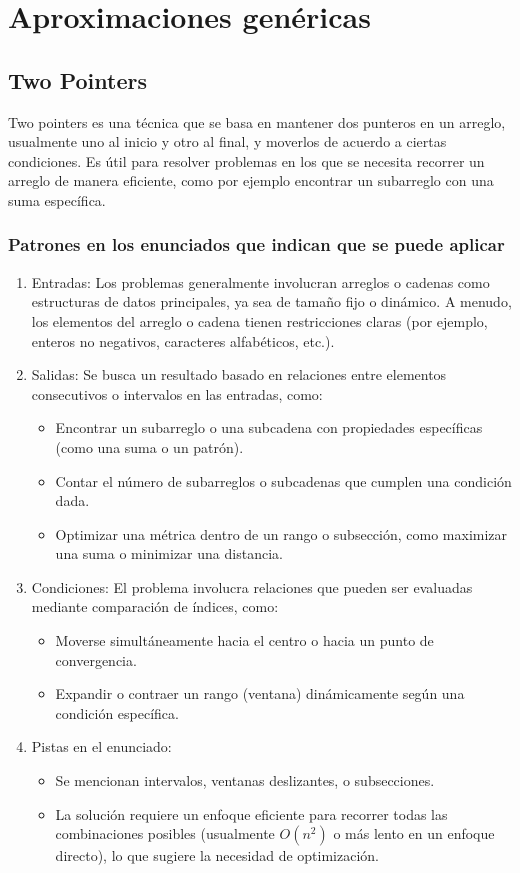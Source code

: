 \section{Aproximaciones genéricas}

\subsection{Two Pointers}
Two pointers es una técnica que se basa en mantener dos punteros en un arreglo, usualmente uno al inicio y otro al final, y moverlos de acuerdo a ciertas condiciones. Es útil para resolver problemas en los que se necesita recorrer un arreglo de manera eficiente, como por ejemplo encontrar un subarreglo con una suma específica. 

\subsubsection{Patrones en los enunciados que indican que se puede aplicar}
\begin{enumerate}
  \item Entradas: Los problemas generalmente involucran arreglos o cadenas como estructuras de datos principales, ya sea de tamaño fijo o dinámico. A menudo, los elementos del arreglo o cadena tienen restricciones claras (por ejemplo, enteros no negativos, caracteres alfabéticos, etc.). 
  \item Salidas: Se busca un resultado basado en relaciones entre elementos consecutivos o intervalos en las entradas, como: 
  \begin{itemize} 
    \item Encontrar un subarreglo o una subcadena con propiedades específicas (como una suma o un patrón). \item Contar el número de subarreglos o subcadenas que cumplen una condición dada. 
    \item Optimizar una métrica dentro de un rango o subsección, como maximizar una suma o minimizar una distancia. 
  \end{itemize} 
  \item Condiciones: El problema involucra relaciones que pueden ser evaluadas mediante comparación de índices, como: 
  \begin{itemize} 
    \item Moverse simultáneamente hacia el centro o hacia un punto de convergencia. 
    \item Expandir o contraer un rango (ventana) dinámicamente según una condición específica. 
  \end{itemize} 
  \item Pistas en el enunciado: 
  \begin{itemize} 
    \item Se mencionan intervalos, ventanas deslizantes, o subsecciones. 
    \item La solución requiere un enfoque eficiente para recorrer todas las combinaciones posibles (usualmente $O(n^2)$ o más lento en un enfoque directo), lo que sugiere la necesidad de optimización. 
  \end{itemize}
\end{enumerate}

